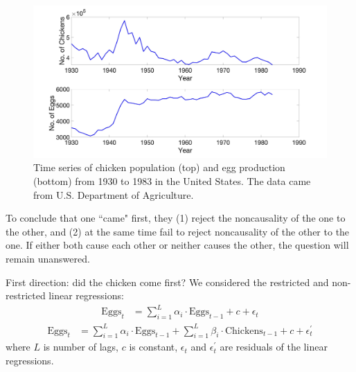 \documentclass[]{article}
\begin{document}
\begin{figure}[H]
	\begin{center}
		\includegraphics[width=15cm]{ChickenEgg_ts.jpg}
		\caption{Time series of chicken population (top) and egg production (bottom) from 1930 to 1983 in the United States. The data came from U.S. Department of Agriculture.}
		\label{ChickenEgg_ts} 
		\vspace{-4mm}
	\end{center}
\end{figure} 

To conclude that one ``came" first, they (1) reject the noncausality of the one to the other, and (2) at the same time fail to reject noncausality of the other to the one. If either both cause each other or neither causes the other, the question will remain unanswered.

First direction: did the chicken come first?
We considered the restricted and non-restricted linear regressions:
\begin{align}
	\text{Eggs}_t &= \sum_{i=1}^L \alpha_i \cdot \text{Eggs}_{t-1} + c + \epsilon_t  \label{Egg}
\end{align}
\begin{align}
	\text{Eggs}_t &= \sum_{i=1}^L \alpha_i \cdot \text{Eggs}_{t-1} + \sum_{i=1}^L \beta_i \cdot \text{Chickens}_{t-1} + c + \epsilon_t^{'} 
	\label{EggChicken}
\end{align}
where $L$ is number of lags, $c$ is constant, $\epsilon_t$ and $\epsilon_t^{'}$ are residuals of the linear regressions.
\end{document}
